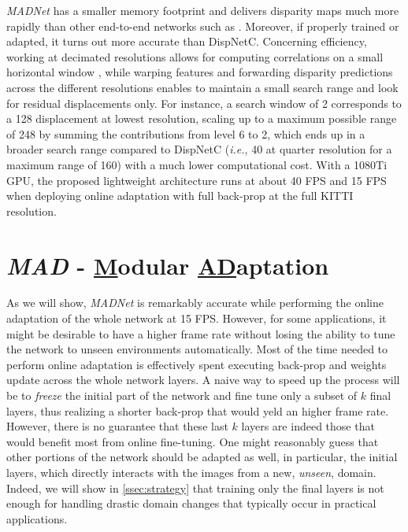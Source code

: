 \documentclass[10pt,twocolumn,letterpaper]{article}
\def\ie{\emph{i.e.}}
\def\netname{\emph{MADNet}}
\def\algoname{\emph{MAD}}
\def\extendedalgoname{\underline{M}odular \underline{AD}aptation}
\def\kitti{KITTI}
\begin{document}
\netname{} has a smaller memory footprint and delivers disparity maps much more rapidly than other end-to-end networks such as \cite{mayer2016large,Kendall_2017_ICCV}. Moreover, if properly trained or adapted, it turns out more accurate than DispNetC. Concerning efficiency, working at decimated resolutions allows for computing correlations on a small horizontal window \cite{sun2018pwc}, while warping features and forwarding disparity predictions across the different resolutions enables to maintain a small search range and look for residual displacements only. For instance, a search window of 2 corresponds to a 128 displacement at lowest resolution, scaling up to a maximum possible range of 248 by summing the contributions from level 6 to 2, which ends up in a broader search range compared to DispNetC (\ie, 40 at quarter resolution for a maximum range of 160) with a much lower computational cost. With a 1080Ti GPU, the proposed lightweight architecture runs at about 40 FPS and 15 FPS when deploying online adaptation with full back-prop at the full \kitti{} resolution. 


\section{\algoname{} - \extendedalgoname{}}
\label{sec:algoDescription}


As we will show, \netname{} is remarkably accurate while performing the online adaptation of the whole network at 15 FPS. However, for some applications, it might be desirable to have a higher frame rate without losing the ability to tune the network to unseen environments automatically. Most of the time needed to perform online adaptation is effectively spent executing back-prop and weights update across the whole network layers. A naive way to speed up the process will be to \textit{freeze} the initial part of the network and fine tune only a subset of $k$ final layers, thus realizing a shorter back-prop that would yeld an higher frame rate. However, there is no guarantee that these last $k$ layers are indeed those that would benefit most from online fine-tuning. One might reasonably guess that other portions of the network should be adapted as well, in particular, the initial layers, which directly interacts with the images from a new, \textit{unseen}, domain. Indeed, we will show in \autoref{ssec:strategy} that training only the final layers is not enough for handling drastic domain changes that typically occur in practical applications. 
\end{document}
